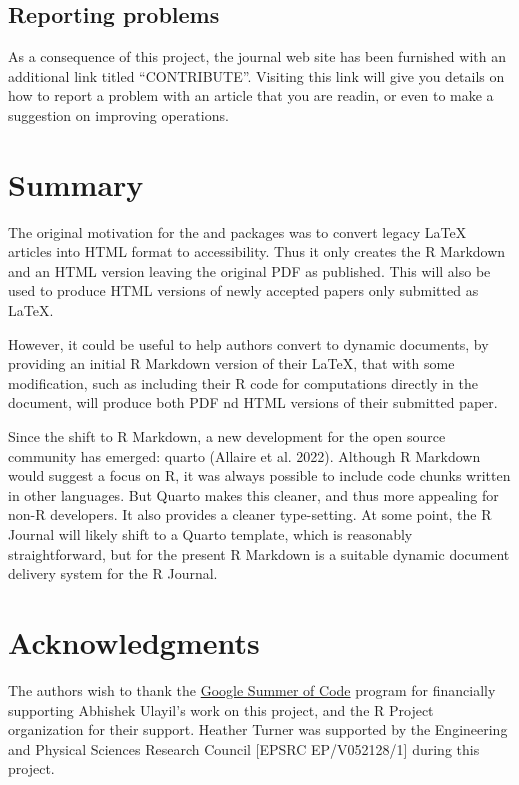 \hypertarget{reporting-problems}{%
\subsection{Reporting problems}\label{reporting-problems}}

As a consequence of this project, the journal web site has been furnished with an additional link titled ``CONTRIBUTE''. Visiting this link will give you details on how to report a problem with an article that you are readin, or even to make a suggestion on improving operations.

\hypertarget{summary}{%
\section{Summary}\label{summary}}

The original motivation for the  and  packages was to convert legacy LaTeX articles into HTML format to accessibility. Thus it only creates the R Markdown and an HTML version leaving the original PDF as published. This will also be used to produce HTML versions of newly accepted papers only submitted as LaTeX.

However, it could be useful to help authors convert to dynamic documents, by providing an initial R Markdown version of their LaTeX, that with some modification, such as including their R code for computations directly in the document, will produce both PDF nd HTML versions of their submitted paper.

Since the shift to R Markdown, a new development for the open source community has emerged: quarto (Allaire et al. 2022). Although R Markdown would suggest a focus on R, it was always possible to include code chunks written in other languages. But Quarto makes this cleaner, and thus more appealing for non-R developers. It also provides a cleaner type-setting. At some point, the R Journal will likely shift to a Quarto template, which is reasonably straightforward, but for the present R Markdown is a suitable dynamic document delivery system for the R Journal.

\hypertarget{acknowledgments}{%
\section*{Acknowledgments}\label{acknowledgments}}

The authors wish to thank the \href{https://summerofcode.withgoogle.com}{Google Summer of Code} program for financially supporting Abhishek Ulayil's work on this project, and the R Project organization for their support. Heather Turner was supported by the Engineering and Physical Sciences Research Council {[}EPSRC EP/V052128/1{]} during this project.

